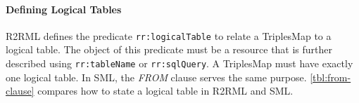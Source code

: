 


%

\paragraph{Defining Logical Tables}
R2RML defines the predicate \texttt{rr:logicalTable} to relate a TriplesMap to a
logical table. The object of this predicate must be a resource that is further
described using \texttt{rr:tableName} or \texttt{rr:sqlQuery}.
A TriplesMap must have exactly one logical table.
In SML, the \emph{FROM} clause serves the same purpose.
\autoref{tbl:from-clause} compares how to state a logical table in
R2RML and SML.

